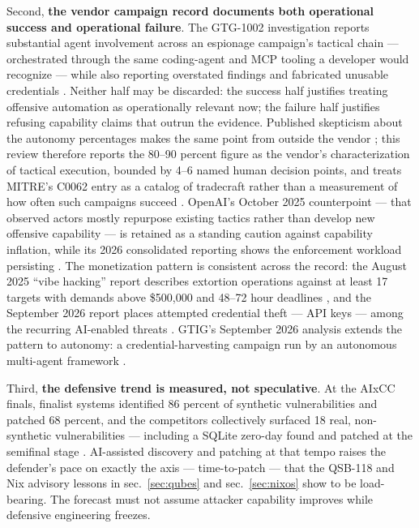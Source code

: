 \documentclass[
  english,
  9pt,
]{extarticle}
\begin{document}
Second, \textbf{the vendor campaign record documents both operational
success and operational failure}. The GTG-1002 investigation reports
substantial agent involvement across an espionage campaign's tactical
chain --- orchestrated through the same coding-agent and MCP tooling a
developer would recognize --- while also reporting overstated findings
and fabricated unusable credentials \citep{anthropic_campaign_report}.
Neither half may be discarded: the success half justifies treating
offensive automation as operationally relevant now; the failure half
justifies refusing capability claims that outrun the evidence. Published
skepticism about the autonomy percentages makes the same point from
outside the vendor \citep{arstechnica_gtg_skepticism}; this review
therefore reports the 80--90 percent figure as the vendor's
characterization of tactical execution, bounded by 4--6 named human
decision points, and treats MITRE's C0062 entry as a catalog of
tradecraft rather than a measurement of how often such campaigns succeed
\citep{mitre_c0062}. OpenAI's October 2025 counterpoint --- that
observed actors mostly repurpose existing tactics rather than develop
new offensive capability --- is retained as a standing caution against
capability inflation, while its 2026 consolidated reporting shows the
enforcement workload persisting
\citep{openai_disruption_oct_2025, openai_disruption_2026}. The
monetization pattern is consistent across the record: the August 2025
``vibe hacking'' report describes extortion operations against at least
17 targets with demands above \$500,000 and 48--72 hour deadlines
\citep{anthropic_misuse_aug_2025}, and the September 2026 report places
attempted credential theft --- API keys --- among the recurring
AI-enabled threats \citep{anthropic_ti_sept_2026}. GTIG's September 2026
analysis extends the pattern to autonomy: a credential-harvesting
campaign run by an autonomous multi-agent framework
\citep{gtig_prompting_autonomy}.

Third, \textbf{the defensive trend is measured, not speculative}. At the
AIxCC finals, finalist systems identified 86 percent of synthetic
vulnerabilities and patched 68 percent, and the competitors collectively
surfaced 18 real, non-synthetic vulnerabilities --- including a SQLite
zero-day found and patched at the semifinal stage
\citep{darpa_aixcc_finals, aixcc_atlantis_paper}. AI-assisted discovery
and patching at that tempo raises the defender's pace on exactly the
axis --- time-to-patch --- that the QSB-118 and Nix advisory lessons in
sec.~\ref{sec:qubes} and sec.~\ref{sec:nixos} show to be load-bearing.
The forecast must not assume attacker capability improves while
defensive engineering freezes.
\end{document}
